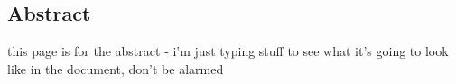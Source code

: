 \vspace*{\fill}

\begin{center}

\section*{Abstract}

this page is for the abstract - i'm just typing stuff to see what it's going to look like in the document, don't be alarmed

\end{center}

\vfill

